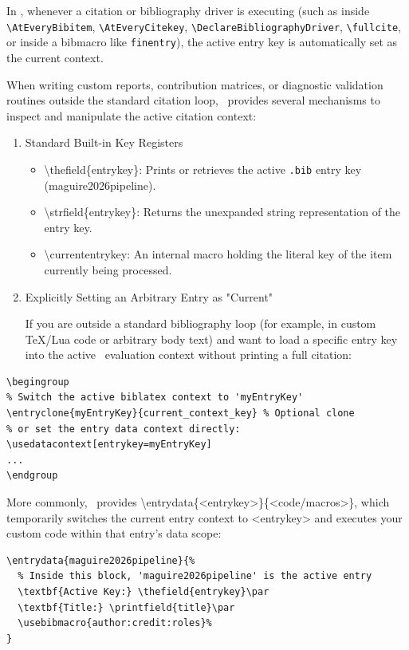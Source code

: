 \documentclass[12pt, twoside]{article}
\newcommand{\fname}[1]{\texttt{#1}}
\begin{document}
In \BibLaTeX, whenever a citation or bibliography driver is executing (such as inside \texttt{\textbackslash AtEveryBibitem}, \texttt{\textbackslash AtEveryCitekey}, \texttt{\textbackslash DeclareBibliographyDriver}, \texttt{\textbackslash fullcite}, or inside a bibmacro like \texttt{finentry}), the active entry key is automatically set as the current context.

When writing custom reports, contribution matrices, or diagnostic validation routines outside the standard citation loop, \BibLaTeX\ provides several mechanisms to inspect and manipulate the active citation context:
\begin{enumerate}
    \item Standard Built-in Key Registers
    \begin{itemize}
        \item \textbackslash thefield\{entrykey\}: Prints or retrieves the active \fname{.bib} entry key (\eg maguire2026pipeline).

        \item \textbackslash strfield\{entrykey\}: Returns the unexpanded string representation of the entry key.

        \item \textbackslash currententrykey: An internal macro holding the literal key of the item currently being processed.
    \end{itemize}
    
    \item Explicitly Setting an Arbitrary Entry as "Current"
    
If you are outside a standard bibliography loop (for example, in custom TeX/Lua code or arbitrary body text) and want to load a specific entry key into the active \BibLaTeX\ evaluation context without printing a full citation:
\end{enumerate}

\begin{lstlisting}[style=latexExampleForAuthors, escapechar=|, basicstyle=\footnotesize, caption={{Load specific entry key}}, label=lst:biberLoadSpecifcEntryKey]
\begingroup
% Switch the active biblatex context to 'myEntryKey'
\entryclone{myEntryKey}{current_context_key} % Optional clone
% or set the entry data context directly:
\usedatacontext[entrykey=myEntryKey]
...
\endgroup
\end{lstlisting}

More commonly, \BibLaTeX\ provides \textbackslash entrydata\{<entrykey>\}\{<code/macros>\}, which temporarily switches the current entry context to <entrykey> and executes your custom code within that entry's data scope:
\begin{lstlisting}[style=latexExampleForAuthors, escapechar=|, basicstyle=\footnotesize, caption={{Temporary switch to specific entry key}}, label=lst:biberTemporarySwitchSpecifcEntryKey]
\entrydata{maguire2026pipeline}{%
  % Inside this block, 'maguire2026pipeline' is the active entry
  \textbf{Active Key:} \thefield{entrykey}\par
  \textbf{Title:} \printfield{title}\par
  \usebibmacro{author:credit:roles}%
}
\end{lstlisting}
\end{document}
